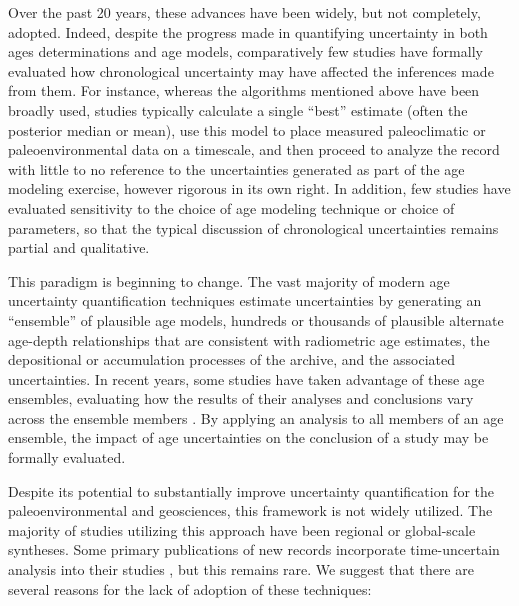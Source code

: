 \documentclass[gchron, manuscript]{copernicus}
\begin{document}
Over the past 20 years, these advances have been widely, but not completely, adopted. Indeed, despite the progress made in quantifying uncertainty in both ages determinations and age models, comparatively few studies have formally evaluated how chronological uncertainty may have affected the inferences made from them.
For instance, whereas the algorithms mentioned above have been broadly used, studies typically calculate a single ``best'' estimate (often the posterior median or mean), use this model to place measured paleoclimatic or paleoenvironmental data on a timescale, and then proceed to analyze the record with little to no reference to the uncertainties generated as part of the age modeling exercise, however rigorous in its own right.
In addition, few studies have evaluated sensitivity to the choice of age modeling technique or choice of parameters, so that the typical discussion of chronological uncertainties remains partial and qualitative.

This paradigm is beginning to change.
The vast majority of modern age uncertainty quantification techniques estimate uncertainties by generating an ``ensemble'' of plausible age models, hundreds or thousands of plausible alternate age-depth relationships that are consistent with radiometric age estimates, the depositional or accumulation processes of the archive, and the associated uncertainties.
In recent years, some studies have taken advantage of these age ensembles, evaluating how the results of their analyses and conclusions vary across the ensemble members \citep[e.g.,][]{blaauw2007testing, parnell2008flexible, blaauw2012out, khider2014, khider2017, bhattacharya2020atlantic}.
By applying an analysis to all members of an age ensemble, the impact of age uncertainties on the conclusion of a study may be formally evaluated.

Despite its potential to substantially improve uncertainty quantification for the paleoenvironmental and geosciences, this framework is not widely utilized.
The majority of studies utilizing this approach have been regional \citep[e.g.,][]{Tierney2013, khider2017, deininger2017coherency, mckay_onset_2018, bhattacharya2020atlantic} or global-scale \citep[e.g.,][]{Shakun_Nature2012, Marcott_Science2013, kaufman2020HoloceneGMST} syntheses.
Some primary publications of new records incorporate time-uncertain analysis into their studies \citep[e.g.,][]{khider2014, Boldt2015, falster2018millennial}, but this remains rare.
We suggest that there are several reasons for the lack of adoption of these techniques:
\end{document}
